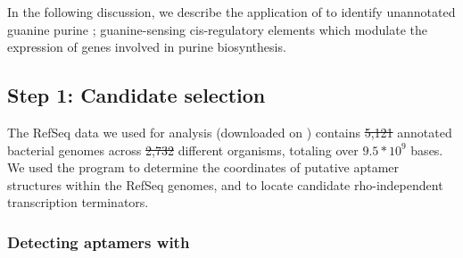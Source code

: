 \documentclass[11pt, oneside]{Thesis} %
\providecommand{\DIFadd}[1]{{\protect\color{blue}\uwave{#1}}} %
\providecommand{\DIFdel}[1]{{\protect\color{red}\sout{#1}}}                      %
\providecommand{\DIFaddbegin}{} %
\providecommand{\DIFaddend}{} %
\providecommand{\DIFdelbegin}{} %
\providecommand{\DIFdelend}{} %
\begin{document}
In the following discussion, we describe the application of \rfinder to identify
unannotated guanine purine \rbs; guanine-sensing cis-regulatory elements
which modulate the expression of genes involved in purine biosynthesis.

\subsection{Step 1: Candidate selection}
\label{subsec:rfinder:selection}

The RefSeq data we used for analysis (downloaded on \fnaRetrievalTime)
contains \DIFdelbegin \DIFdel{5,121 }\DIFdelend \DIFaddbegin \DIFadd{$5,121$ }\DIFaddend annotated bacterial genomes
across \DIFdelbegin \DIFdel{2,732 }\DIFdelend \DIFaddbegin \DIFadd{$2,732$ }\DIFaddend different organisms, totaling over \DIFdelbegin \DIFdel{$9.5 * 10^9$ }\DIFdelend \DIFaddbegin \DIFadd{$9.5 \times 10^9$ }\DIFaddend bases. We used the
program \infernal to determine the coordinates of putative aptamer structures
within the RefSeq genomes, and \tthp to locate candidate rho-independent
transcription terminators.

\subsubsection{Detecting aptamers with \infernal}
\label{subsubsec:rfinder:infernal}
\end{document}
